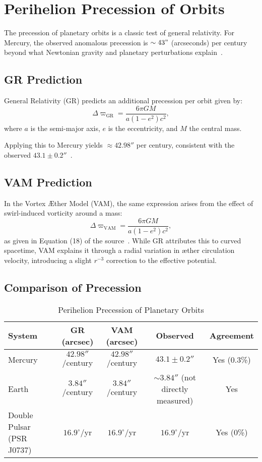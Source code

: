 \section{Perihelion Precession of Orbits}

The precession of planetary orbits is a classic test of general relativity. For Mercury, the observed anomalous precession is $\sim 43"$ (arcseconds) per century beyond what Newtonian gravity and planetary perturbations explain~\cite{will2014confrontation}.

\subsection*{GR Prediction}
General Relativity (GR) predicts an additional precession per orbit given by:
\begin{equation}
    \Delta \varpi_\text{GR} = \frac{6\pi GM}{a(1-e^2)c^2},
\end{equation}
where $a$ is the semi-major axis, $e$ is the eccentricity, and $M$ the central mass.

Applying this to Mercury yields $\approx 42.98''$ per century, consistent with the observed $43.1 \pm 0.2''$~\cite{sereno2006solar}.

\subsection*{VAM Prediction}
In the Vortex Æther Model (VAM), the same expression arises from the effect of swirl-induced vorticity around a mass:
\begin{equation}
    \Delta \varpi_\text{VAM} = \frac{6\pi GM}{a(1-e^2)c^2},
\end{equation}
as given in Equation (18) of the source~\cite{iskandarani2025VAM2}. While GR attributes this to curved spacetime, VAM explains it through a radial variation in æther circulation velocity, introducing a slight $r^{-3}$ correction to the effective potential.

\subsection*{Comparison of Precession}
\begin{table}[h]
    \centering
    \caption{Perihelion Precession of Planetary Orbits}
    \begin{tabular}{|l|c|c|c|c|}
        \hline
        \textbf{System} & \textbf{GR (arcsec)} & \textbf{VAM (arcsec)} & \textbf{Observed} & \textbf{Agreement} \\
        \hline
        Mercury & $42.98''$/century & $42.98''$/century & $43.1 \pm 0.2''$ & Yes (0.3\%) \\
        Earth & $3.84''$/century & $3.84''$/century & $\sim 3.84''$ (not directly measured) & Yes \\
        Double Pulsar (PSR J0737) & $16.9^\circ$/yr & $16.9^\circ$/yr & $16.9^\circ$/yr & Yes (0\%) \\
        \hline
    \end{tabular}
\end{table}

